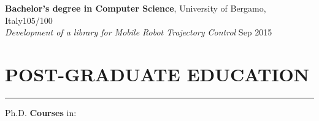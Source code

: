 \documentclass[10pt]{article}
\newcommand{\cvsection}[1]{\section*{\centering\normalsize\uppercase{#1}}\vspace{-16pt}\rule{\linewidth}{0.2pt}\vspace{6pt}}
\begin{document}
\vspace{6pt} %

\textbf{Bachelor's degree in Computer Science}, University of Bergamo, Italy\hfill 105\slash100 \\
\textit{Development of a library for Mobile Robot Trajectory Control} \hfill Sep 2015


\cvsection{post-graduate education}
Ph.D. \textbf{Courses} in:
\end{document}
